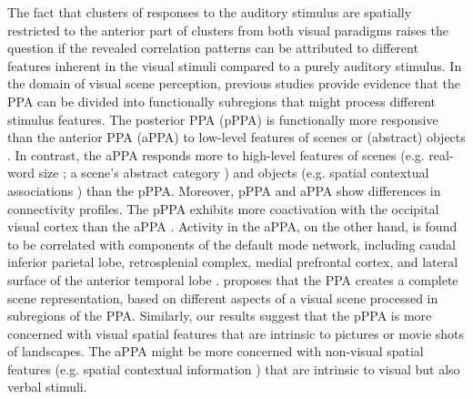 \documentclass[english,11pt]{article}
\begin{document}
The fact that clusters of responses to the auditory stimulus are spatially
restricted to the anterior part of clusters from both visual paradigms raises
the question if the revealed correlation patterns can be attributed to different
features inherent in the visual stimuli compared to a purely auditory stimulus.
In the domain of visual scene perception, previous studies provide evidence that
the PPA can be divided into functionally subregions that might process different
stimulus features.
The posterior PPA (pPPA) is functionally more responsive than the anterior PPA
(aPPA) to low-level features of scenes or (abstract) objects
\citep{baldassano2013differential, lescroart2019human, nasr2014thinking,
rajimehr2011parahippocampal}.
In contrast, the aPPA responds more to high-level features of scenes (e.g.
real-word size \citep{park2015parametric}; a scene's abstract category
\citep{marchette2015outside, watson2016patterns}) and objects (e.g. spatial
contextual associations \citep{aminoff2007parahippocampal, aminoff2013role})
than the pPPA.
Moreover, pPPA and aPPA show differences in connectivity profiles.
The pPPA exhibits more coactivation with the occipital visual cortex than the
aPPA \citep{baldassano2013differential, baldassano2016two}.
Activity in the aPPA, on the other hand, is found to be correlated with
components of the default mode network, including caudal inferior parietal lobe,
retrosplenial complex, medial prefrontal cortex, and lateral surface of the
anterior temporal lobe \citep{baldassano2013differential, baldassano2016two}.
\citet{baldassano2013differential} proposes that the PPA creates a complete
scene representation, based on different aspects of a visual scene processed in
subregions of the PPA.
Similarly, our results suggest that the pPPA is more concerned with visual
spatial features that are intrinsic to pictures or movie shots of
landscapes.
The aPPA might be more concerned with non-visual spatial features
(e.g. spatial contextual information \citep{aminoff2007parahippocampal}) that
are intrinsic to visual but also verbal stimuli.
\end{document}
